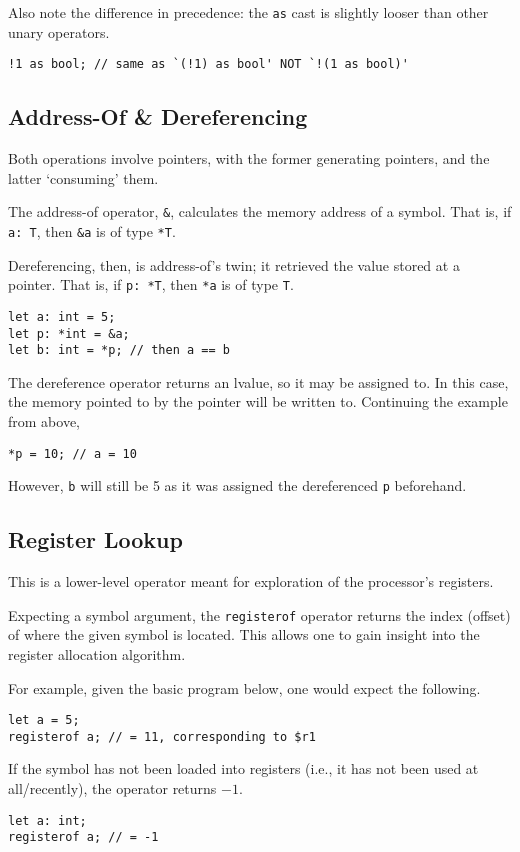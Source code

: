 Also note the difference in precedence: the \texttt{as} cast is slightly looser than other unary operators.

\begin{lstlisting}[language=CustomLang]
!1 as bool; // same as `(!1) as bool' NOT `!(1 as bool)'
\end{lstlisting}

\subsection{Address-Of \& Dereferencing}\label{subsec:address-of-&-dereferencing}

Both operations involve pointers, with the former generating pointers, and the latter `consuming' them.

The address-of operator, \texttt{\&}, calculates the memory address of a symbol.
That is, if \texttt{a: T}, then \texttt{\&a} is of type \texttt{*T}.

Dereferencing, then, is address-of's twin; it retrieved the value stored at a pointer.
That is, if \texttt{p: *T}, then \texttt{*a} is of type \texttt{T}.

\begin{lstlisting}[language=CustomLang]
let a: int = 5;
let p: *int = &a;
let b: int = *p; // then a == b
\end{lstlisting}

The dereference operator returns an lvalue, so it may be assigned to.
In this case, the memory pointed to by the pointer will be written to.
Continuing the example from above,

\begin{lstlisting}[language=CustomLang]
*p = 10; // a = 10
\end{lstlisting}

However, \texttt{b} will still be 5 as it was assigned the dereferenced \texttt{p} beforehand.

\subsection{Register Lookup}

This is a lower-level operator meant for exploration of the processor's registers.

Expecting a symbol argument, the \texttt{registerof} operator returns the index (offset) of where the given symbol is located.
This allows one to gain insight into the register allocation algorithm.

For example, given the basic program below, one would expect the following.

\begin{lstlisting}[language=CustomLang]
let a = 5;
registerof a; // = 11, corresponding to $r1
\end{lstlisting}

If the symbol has not been loaded into registers (i.e., it has not been used at all/recently), the operator returns \(-1\).

\begin{lstlisting}[language=CustomLang]
let a: int;
registerof a; // = -1
\end{lstlisting}

